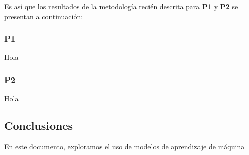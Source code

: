 \documentclass[9pt,twocolumn,twoside]{ilcss}
\begin{document}
Es así que los resultados de la metodología recién descrita para \textbf{P1} y \textbf{P2} se presentan a continuación:

\subsubsection{P1}

Hola	

\subsubsection{P2}

Hola


\subsection{Conclusiones}

En este documento, exploramos el uso de modelos de aprendizaje de máquina 



\newpage
\end{document}
